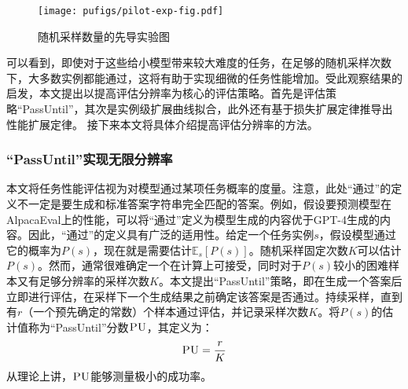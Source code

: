 \begin{figure}[htbp]
\centering
    \texttt{[image: pufigs/pilot-exp-fig.pdf]}
    \caption{随机采样数量的先导实验图}
    \label{tab:opensourcemodel_rs}
\end{figure}

可以看到，即使对于这些给小模型带来较大难度的任务，在足够的随机采样次数下，大多数实例都能通过，这将有助于实现细微的任务性能增加。受此观察结果的启发，本文提出以提高评估分辨率为核心的评估策略。首先是评估策略“PassUntil”，其次是实例级扩展曲线拟合，此外还有基于损失扩展定律推导出性能扩展定律。 接下来本文将具体介绍提高评估分辨率的方法。

\subsubsection{“PassUntil”实现无限分辨率}
本文将任务性能评估视为对模型通过某项任务概率的度量。注意，此处“通过”的定义不一定是要生成和标准答案字符串完全匹配的答案。例如，假设要预测模型在AlpacaEval\citep{alpaca_eval}上的性能，可以将“通过”定义为模型生成的内容优于GPT-4生成的内容。因此，“通过”的定义具有广泛的适用性。给定一个任务实例$s$，假设模型通过它的概率为$P(s)$，现在就是需要估计$\mathbb{E}_s[P(s)]$。随机采样固定次数$K$可以估计$P(s)$。然而，通常很难确定一个在计算上可接受，同时对于$P(s)$较小的困难样本又有足够分辨率的采样次数$K$。本文提出“PassUntil”策略，即在生成一个答案后立即进行评估，在采样下一个生成结果之前确定该答案是否通过。持续采样，直到有$r$（一个预先确定的常数）个样本通过评估，并记录采样次数$K$。将$P(s)$的估计值称为“PassUntil”分数$\textsc{PU}$，其定义为：
\begin{equation}
\label{equ:pudef}
    \textsc{PU} = \frac{r}{K}
\end{equation}
从理论上讲，$\textsc{PU}$能够测量极小的成功率。

